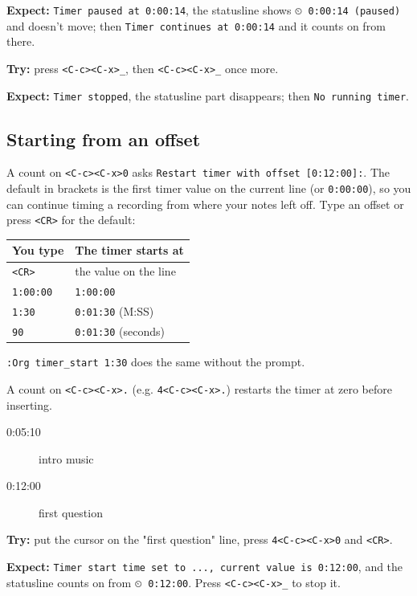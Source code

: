\textbf{Expect:} \texttt{Timer paused at 0:00:14}, the statusline shows
\texttt{⏲ 0:00:14 (paused)} and doesn't move; then \texttt{Timer continues at 0:00:14}
and it counts on from there.

\textbf{Try:} press \texttt{<C-c><C-x>\_}, then \texttt{<C-c><C-x>\_} once more.

\textbf{Expect:} \texttt{Timer stopped}, the statusline part disappears; then
\texttt{No running timer}.
\subsection{Starting from an offset}
\label{sec:org99371d7}
A count on \texttt{<C-c><C-x>0} asks \texttt{Restart timer with offset [0:12:00]:}. The
default in brackets is the first timer value on the current line (or
\texttt{0:00:00}), so you can continue timing a recording from where your notes
left off. Type an offset or press \texttt{<CR>} for the default:

\begin{center}
\begin{tabular}{ll}
You type & The timer starts at\\
\hline
\texttt{<CR>} & the value on the line\\
\texttt{1:00:00} & \texttt{1:00:00}\\
\texttt{1:30} & \texttt{0:01:30} (M:SS)\\
\texttt{90} & \texttt{0:01:30} (seconds)\\
\end{tabular}
\end{center}

\texttt{:Org timer\_start 1:30} does the same without the prompt.

A count on \texttt{<C-c><C-x>.} (e.g. \texttt{4<C-c><C-x>.}) restarts the timer at zero
before inserting.

\begin{description}
\item[{0:05:10}] intro music
\item[{0:12:00}] first question
\end{description}

\textbf{Try:} put the cursor on the "first question" line, press \texttt{4<C-c><C-x>0}
and \texttt{<CR>}.

\textbf{Expect:} \texttt{Timer start time set to ..., current value is 0:12:00}, and the
statusline counts on from \texttt{⏲ 0:12:00}. Press \texttt{<C-c><C-x>\_} to stop it.

